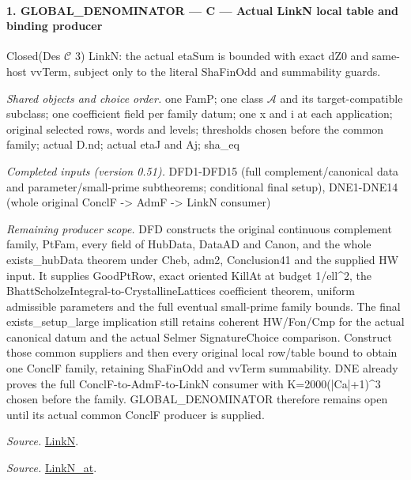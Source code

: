 \documentclass[11pt,a4paper]{article}
\numberwithin{equation}{section}
\theoremstyle{remark}\newtheorem{remark}[theorem]{Remark}
\begin{document}
\paragraph{1. GLOBAL\_\allowbreak DENOMINATOR — C — Actual LinkN local table and binding producer}

Closed(Des $\mathcal C$ 3) LinkN: the actual etaSum is bounded with exact dZ0 and same-host vvTerm, subject only to the literal ShaFinOdd and summability guards.

\emph{Shared objects and choice order.} one FamP; one class $\mathcal A$ and its target-compatible subclass; one coefficient field per family datum; one x and i at each application; original selected rows, words and levels; thresholds chosen before the common family; actual D.nd; actual etaJ and Aj; sha\_\allowbreak eq

\emph{Completed inputs (version 0.51).} DFD1-DFD15 (full complement/canonical data and parameter/small-prime subtheorems; conditional final setup), DNE1-DNE14 (whole original ConclF -> AdmF -> LinkN consumer)

\emph{Remaining producer scope.} DFD constructs the original continuous complement family, PtFam, every field of HubData, DataAD and Canon, and the whole exists\_\allowbreak hubData theorem under Cheb, adm2, Conclusion41 and the supplied HW input. It supplies GoodPtRow, exact oriented KillAt at budget 1/ell\textasciicircum{}2, the BhattScholzeIntegral-to-CrystallineLattices coefficient theorem, uniform admissible parameters and the full eventual small-prime family bounds. The final exists\_\allowbreak setup\_\allowbreak large implication still retains coherent HW/Fon/Cmp for the actual canonical datum and the actual Selmer SignatureChoice comparison. Construct those common suppliers and then every original local row/table bound to obtain one ConclF family, retaining ShaFinOdd and vvTerm summability. DNE already proves the full ConclF-to-AdmF-to-LinkN consumer with K=2000(|Ca|+1)\textasciicircum{}3 chosen before the family. GLOBAL\_\allowbreak DENOMINATOR therefore remains open until its actual common ConclF producer is supplied.

\emph{Source.} \href{https://github.com/CocoSgt/riemann-hypothesis-lean/blob/7cbf7a0c32fca1badf05931879a37c3f8a2b03b4/src/Formalism/SharpRestriction/GlobalTheoremInputs.lean#L45-L48}{LinkN}.

\emph{Source.} \href{https://github.com/CocoSgt/riemann-hypothesis-lean/blob/7cbf7a0c32fca1badf05931879a37c3f8a2b03b4/src/Formalism/SharpRestriction/GlobalTheoremInputs.lean#L40-L44}{LinkN\_\allowbreak at}.
\end{document}
